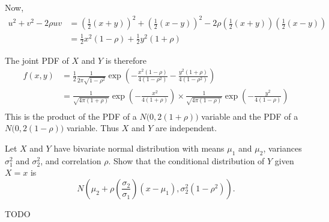 \begin{exercise}
\begin{questions}
\begin{answer}
Now,
\begin{align*}
u^2 + v^2 - 2\rho uv
	& = \left(\frac{1}{2}(x+y)\right)^2 +\left(\frac{1}{2}(x-y)\right)^2 - 2\rho\left(\frac{1}{2}(x+y)\right)\left(\frac{1}{2}(x-y)\right) \\
	& = \frac{1}{2}x^2(1-\rho ) + \frac{1}{2}y^2(1+\rho )
\end{align*}	

The joint PDF of $X$ and $Y$ is therefore
\begin{align*}
f(x,y) 
	& = \frac{1}{2} \frac{1}{2\pi\sqrt{1-\rho ^{2}}}\exp\left( -\frac{x^{2} (1-\rho )}{4(1-\rho ^{2} )} -\frac{y^{2} (1+\rho )}{4(1-\rho ^{2})}\right) \\
	& = \frac{1}{\sqrt{4\pi(1+\rho)}}\exp\left(-\frac{x^{2}}{4(1+\rho)}\right) \times \frac{1}{\sqrt{4\pi(1-\rho)}}\exp\left(-\frac{y^{2}}{4(1-\rho )}\right) \\
\end{align*}
This is the product of the PDF of a $N\big(0,2(1+\rho)\big)$ variable and the PDF of a $N\big(0,2(1-\rho)\big)$ variable. Thus $X$ and $Y$ are independent. 
\end{answer}

\question
Let $X$ and $Y$ have bivariate normal distribution with means $\mu_1$ and $\mu_2$, variances $\sigma_1^2$ and $\sigma_2^2$, and correlation $\rho$. Show that the conditional distribution of $Y$ given $X=x$ is
\[
N\left(\mu_2 + \rho\left(\frac{\sigma_2}{\sigma_1}\right)(x-\mu_1), \sigma_2^2(1-\rho^2)\right).
\]
\begin{answer}
TODO
\end{answer}
\question
{}
\end{questions}
\end{exercise}
